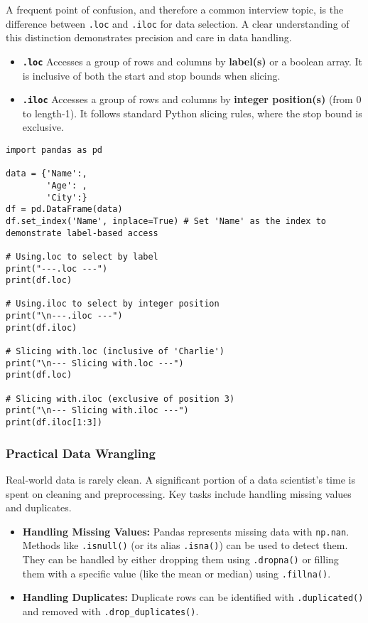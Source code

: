 \documentclass[11pt,a4paper]{article}
\begin{document}
A frequent point of confusion, and therefore a common interview topic, is the difference between \texttt{.loc} and \texttt{.iloc} for data selection. A clear understanding of this distinction demonstrates precision and care in data handling.

\begin{itemize}
    \item \textbf{\texttt{.loc}} Accesses a group of rows and columns by \textbf{label(s)} or a boolean array. It is inclusive of both the start and stop bounds when slicing.
    \item \textbf{\texttt{.iloc}} Accesses a group of rows and columns by \textbf{integer position(s)} (from 0 to length-1). It follows standard Python slicing rules, where the stop bound is exclusive.
\end{itemize}

\begin{lstlisting}
import pandas as pd

data = {'Name':,
        'Age': ,
        'City':}
df = pd.DataFrame(data)
df.set_index('Name', inplace=True) # Set 'Name' as the index to demonstrate label-based access

# Using.loc to select by label
print("---.loc ---")
print(df.loc)

# Using.iloc to select by integer position
print("\n---.iloc ---")
print(df.iloc)

# Slicing with.loc (inclusive of 'Charlie')
print("\n--- Slicing with.loc ---")
print(df.loc)

# Slicing with.iloc (exclusive of position 3)
print("\n--- Slicing with.iloc ---")
print(df.iloc[1:3])
\end{lstlisting}

\subsubsection{Practical Data Wrangling}

Real-world data is rarely clean. A significant portion of a data scientist's time is spent on cleaning and preprocessing. Key tasks include handling missing values and duplicates.

\begin{itemize}
    \item \textbf{Handling Missing Values:} Pandas represents missing data with \texttt{np.nan}. Methods like \texttt{.isnull()} (or its alias \texttt{.isna()}) can be used to detect them. They can be handled by either dropping them using \texttt{.dropna()} or filling them with a specific value (like the mean or median) using \texttt{.fillna()}.
    \item \textbf{Handling Duplicates:} Duplicate rows can be identified with \texttt{.duplicated()} and removed with \texttt{.drop\_duplicates()}.
\end{itemize}
\end{document}
